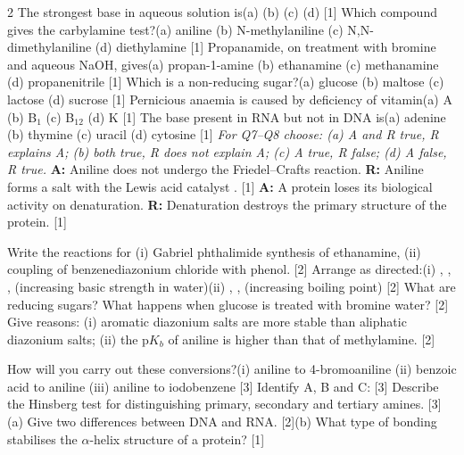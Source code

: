\documentclass[10pt,a4paper]{extarticle}
\newcommand{\mk}[1]{{\scriptsize\color{black!55}[#1]}}
\begin{document}
\begin{multicols}{2}\raggedcolumns
{}
\Q The strongest base in aqueous solution is\nl (a)  \quad (b)  \quad (c)  \quad (d)  \mk{1}
\Q Which compound gives the carbylamine test?\nl (a) aniline \quad (b) N-methylaniline \quad (c) N,N-dimethylaniline \quad (d) diethylamine \mk{1}
\Q Propanamide, on treatment with bromine and aqueous NaOH, gives\nl (a) propan-1-amine \quad (b) ethanamine \quad (c) methanamine \quad (d) propanenitrile \mk{1}
\Q Which is a non-reducing sugar?\nl (a) glucose \quad (b) maltose \quad (c) lactose \quad (d) sucrose \mk{1}
\Q Pernicious anaemia is caused by deficiency of vitamin\nl (a) A \quad (b) B$_1$ \quad (c) B$_{12}$ \quad (d) K \mk{1}
\Q The base present in RNA but not in DNA is\nl (a) adenine \quad (b) thymine \quad (c) uracil \quad (d) cytosine \mk{1}
\nl\textit{For Q7--Q8 choose: (a) A and R true, R explains A; (b) both true, R does not explain A; (c) A true, R false; (d) A false, R true.}
\Q \textbf{A:} Aniline does not undergo the Friedel--Crafts reaction. \textbf{R:} Aniline forms a salt with the Lewis acid catalyst . \mk{1}
\Q \textbf{A:} A protein loses its biological activity on denaturation. \textbf{R:} Denaturation destroys the primary structure of the protein. \mk{1}

\Q Write the reactions for (i) Gabriel phthalimide synthesis of ethanamine, (ii) coupling of benzenediazonium chloride with phenol. \mk{2}
\Q Arrange as directed:\nl (i) , , ,  (increasing basic strength in water)\nl (ii) , ,  (increasing boiling point) \mk{2}
\Q What are reducing sugars? What happens when glucose is treated with bromine water? \mk{2}
\Q Give reasons: (i) aromatic diazonium salts are more stable than aliphatic diazonium salts; (ii) the p$K_b$ of aniline is higher than that of methylamine. \mk{2}

\Q How will you carry out these conversions?\nl (i) aniline to 4-bromoaniline \quad (ii) benzoic acid to aniline \quad (iii) aniline to iodobenzene \mk{3}
\Q Identify A, B and C:\nl {} \mk{3}
\Q Describe the Hinsberg test for distinguishing primary, secondary and tertiary amines. \mk{3}
\Q (a) Give two differences between DNA and RNA. \mk{2}\nl (b) What type of bonding stabilises the $\alpha$-helix structure of a protein? \mk{1}


\end{multicols}
\end{document}
